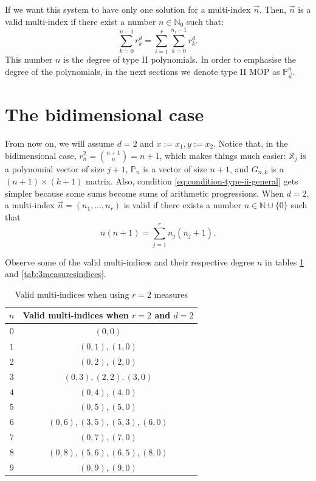 \documentclass[12pt,a4]{article}
\theoremstyle{plain}
\newcommand{\N}[0]{\mathbb{N}}
\begin{document}
If we want this system to have only one solution for a multi-index $\vec n$. Then, $\vec n$ is a valid multi-index if there exist a number $n\in\N_0$ such that:
\begin{equation}
    \label{eq:condition-type-ii-general}
    \displaystyle\sum_{k=0}^{n-1} r^d_k = \sum_{i=1}^r \sum_{k=0}^{n_i-1} r_k^d.
\end{equation}
This number $n$ is the degree of type II polynomials. In order to emphasise the degree of the polynomials, in the next sections we denote type II MOP as $\mathbb P_{\vec n}^n$.
\section{The bidimensional case}

From now on, we will assume $d=2$ and $x:=x_1, y:=x_2$. Notice that, in the bidimensional case, $r^2_n = \binom{n+1}{n} = n+1$, which makes things much easier: $\mathbb X_j$ is a polynomial vector of size $j+1$, $\mathbb P_n$ is a vector of size $n+1$, and $G_{n,k}$ is a $(n+1)\times(k+1)$ matrix. Also, condition \eqref{eq:condition-type-ii-general} gets simpler because some sums become sums of arithmetic progressions. When $d=2$, a multi-index $\vec n =(n_1,\dots,n_r)$ is valid if there exists a number $n\in\N\cup \{0\}$ such that
\begin{equation}
    \label{eq:condition-type-ii}
    n(n+1)=\sum_{j=1}^r n_j (n_j+1).
\end{equation} 

Observe some of the valid multi-indices and their respective degree $n$ in tables \ref{tab:2measuresindices} and \ref{tab:3measuresindices}.

\begin{table}[h]
    \centering
    \begin{tabular}{|c|c|}
    \hline
    $n$ & Valid multi-indices when $r=2$ and $d=2$ \\ \hline
    $0$ & $(0,0)$                                  \\ \hline
    $1$ & $(0,1), (1,0)$                           \\ \hline
    $2$ & $(0, 2), (2, 0)$                         \\ \hline
    $3$ & $(0, 3), (2, 2), (3, 0)$                 \\ \hline
    $4$ & $(0, 4), (4, 0)$                         \\ \hline
    $5$ & $(0, 5), (5, 0)$                         \\ \hline
    $6$ & $(0, 6), (3, 5), (5, 3), (6, 0)$         \\ \hline
    $7$ & $(0, 7), (7, 0)$                         \\ \hline
    $8$ & $(0, 8), (5, 6), (6, 5), (8, 0)$         \\ \hline
    $9$ & $(0, 9), (9, 0)$                         \\ \hline
    \end{tabular}
    \caption{Valid multi-indices when using $r=2$ measures}
    \label{tab:2measuresindices}
\end{table}
\end{document}
